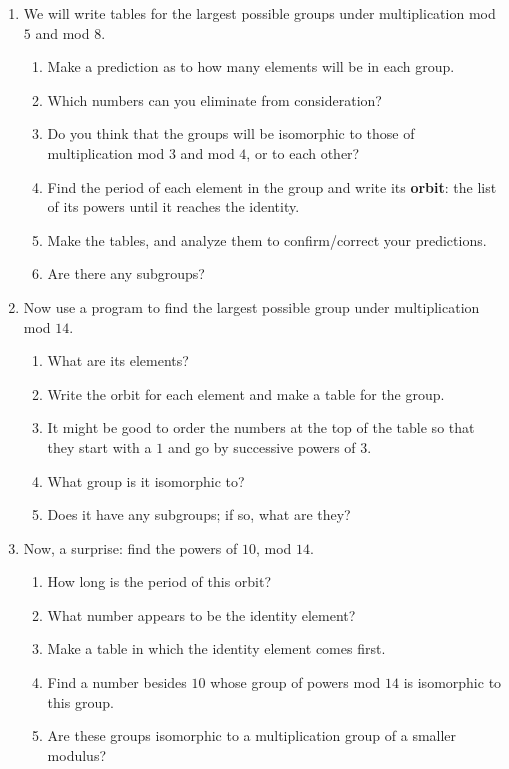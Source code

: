 \documentclass[../gatm.tex]{subfiles}
\begin{document}
\begin{enumerate}
\setcounter{enumi}{\value{problem_i}}
\item We will write tables for the largest possible groups under multiplication mod $5$ and mod $8$.
\begin{enumerate}
\item Make a prediction as to how many elements will be in each group.
\item Which numbers can you eliminate from consideration?
\item Do you think that the groups will be isomorphic to those of multiplication mod $3$ and mod $4$, or to each other?
\item Find the period of each element in the group and write its \textbf{orbit}: the list of its powers until it reaches the identity.
\item Make the tables, and analyze them to confirm/correct your predictions.
\item Are there any subgroups?
\end{enumerate}
\item Now use a program to find the largest possible group under multiplication mod $14$.
\begin{enumerate}
\item What are its elements?
\item Write the orbit for each element and make a table for the group.
\item It might be good to order the numbers at the top of the table so that they start with a $1$ and go by successive powers of $3$.
\item What group is it isomorphic to?
\item Does it have any subgroups; if so, what are they?
\end{enumerate}
\item Now, a surprise: find the powers of $10$, mod $14$.
\begin{enumerate}
\item How long is the period of this orbit?
\item What number appears to be the identity element?
\item Make a table in which the identity element comes first.
\item Find a number besides $10$ whose group of powers mod $14$ is isomorphic to this group.
\item Are these groups isomorphic to a multiplication group of a smaller modulus?
\end{enumerate}

\end{enumerate}
\end{document}

